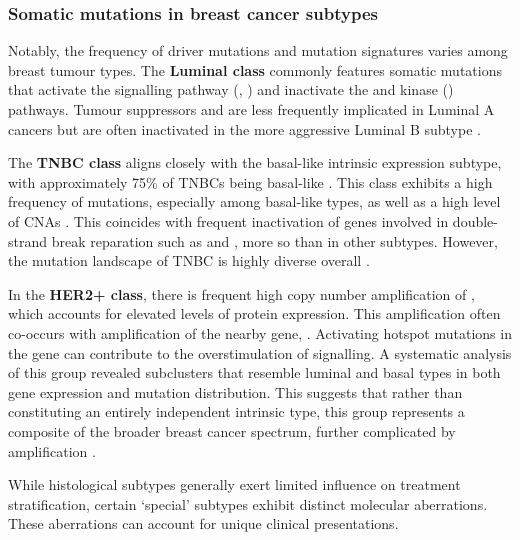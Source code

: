 \subsubsection*{Somatic mutations in breast cancer subtypes}

Notably, the frequency of driver mutations and mutation signatures varies among breast tumour types. The \textbf{Luminal class} commonly features somatic mutations that activate the  signalling pathway (, ) and inactivate the  and  kinase () pathways. Tumour suppressors  and  are less frequently implicated in Luminal A cancers but are often inactivated in the more aggressive Luminal B subtype \parencite{Cancer_Genome_Atlas_Network2012-gx}.

The \textbf{\ac{TNBC} class} aligns closely with the basal-like intrinsic expression subtype, with approximately 75\% of \ac{TNBC}s being basal-like \parencite{Shah2012-xz}. This class exhibits a high frequency of  mutations, especially among basal-like types, as well as a high level of \acp{CNA} \parencite{Shah2012-xz, Cancer_Genome_Atlas_Network2012-gx}. This coincides with frequent inactivation of genes involved in double-strand break reparation such as  and , more so than in other subtypes. However, the mutation landscape of \ac{TNBC} is highly diverse overall \parencite{Shah2012-xz}.

In the \textbf{HER2+ class}, there is frequent high copy number amplification of , which accounts for elevated levels of  protein expression. This amplification often co-occurs with amplification of the nearby gene, . Activating hotspot mutations in the  gene can contribute to the overstimulation of  signalling. A systematic analysis of this group revealed subclusters that resemble luminal and basal types in both gene expression and mutation distribution. This suggests that rather than constituting an entirely independent intrinsic type, this group represents a composite of the broader breast cancer spectrum, further complicated by  amplification \parencite{Ferrari2016-qj}.

While histological subtypes generally exert limited influence on treatment stratification, certain `special' subtypes exhibit distinct molecular aberrations. These aberrations can account for unique clinical presentations.


